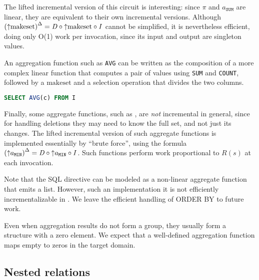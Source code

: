 The lifted incremental version of this circuit is interesting: since $\pi$ 
and $a_\texttt{SUM}$ are linear, they are equivalent to their own incremental 
versions.  Although ${({\uparrow}\mbox{makeset})}^{\Delta} = \mathit{D} \circ {\uparrow}\mbox{makeset} \circ \mathit{I}$
cannot be simplified, it is nevertheless efficient, doing only O(1) work per
invocation, since its input and output are singleton values.

An aggregation function such as \texttt{AVG} can be written as the composition of 
a more complex linear function that computes a pair of values using 
\texttt{SUM} and \texttt{COUNT}, followed by a $\mbox{makeset}$ and a selection operation
that divides the two columns.

\begin{lstlisting}[language=SQL]
SELECT AVG(c) FROM I 
\end{lstlisting}


Finally, some aggregate functions, such as , are 
\emph{not} incremental in general, since for handling deletions
they may need to know the full set, and not just its changes.  The lifted
incremental version of such aggregate functions is implemented essentially
by ``brute force'', using the formula ${({\uparrow}a_\texttt{MIN})}^{\Delta}
= \mathit{D} \circ {\uparrow}a_\texttt{MIN} \circ \mathit{I}$.  Such functions perform work
proportional to $R(s)$ at each invocation.

Note that the SQL  directive can be modeled as
a non-linear aggregate function that emits a list.  However, such an implementation it is not efficiently incrementalizable in \dbsp. 
We leave the efficient handling of ORDER BY to future work.

Even when aggregation results do not form a group, they usually form
a structure with a zero element.  We expect that a well-defined
aggregation function maps empty \zrs to zeros in the target domain.


\subsection{Nested relations}

